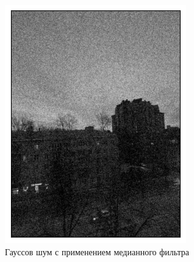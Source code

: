 \documentclass[a4paper,12pt]{article}
\begin{document}
        \begin{figure}[H]
            \begin{minipage}{0.49\textwidth}
                \centering \includegraphics[width=\textwidth]{results/nlf_gaus_1.png}
                \caption{Гауссов шум с применением медианного фильтра}
            \end{minipage}\hfill
            \begin{minipage}{0.49\textwidth}

\end{minipage}
\end{figure}
\end{document}
